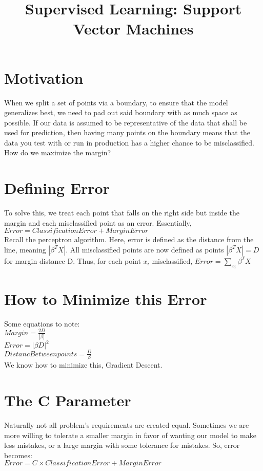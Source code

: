 \documentclass{article}
\title{Supervised Learning: Support Vector Machines}
\begin{document}
\maketitle
\section{Motivation}
When we split a set of points via a boundary, to ensure that the model generalizes best, we need to pad out said boundary with as much space as possible. If our data is assumed to be representative of the data that shall be used for prediction, then having many points on the boundary means that the data you test with or run in production has a higher chance to be misclassified. How do we maximize the margin?

\section{Defining Error}
To solve this, we treat each point that falls on the right side but inside the margin and each misclassified point as an error. Essentially,\\
$Error = Classification Error +  Margin Error$\\
Recall the perceptron algorithm. Here, error is defined as the distance from the line, meaning $|\beta^TX|$. All misclassified  points are now defined as points $|\beta^TX| = D$ for margin distance D. Thus, for each point $x_i$ misclassified, $Error=\sum_{x_i} \beta^TX$

\section{How to Minimize this Error}
Some equations to note:\\
$Margin = \frac{2D}{|\beta|}$\\
$Error=|\beta D|^2$\\
$Distanc Between points = \frac{D}{\beta}$\\

We know how to minimize this, Gradient Descent.

\section{The C Parameter}
Naturally not all problem's requirements are created equal. Sometimes we are more willing to tolerate a smaller margin in favor of wanting our model to make less mistakes, or a large margin with some tolerance for mistakes. So, error becomes:\\
$Error = C \times Classification Error +  Margin Error$\\
\end{document}
